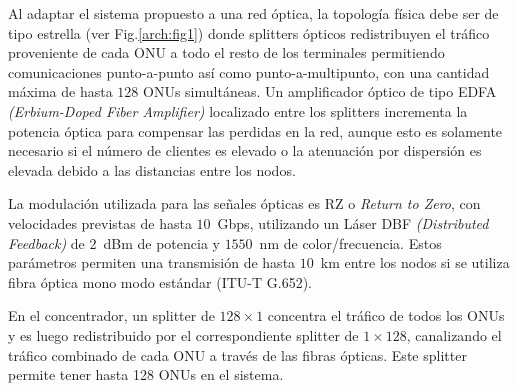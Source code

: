 


Al adaptar el sistema propuesto a una red óptica, la topología física debe ser de tipo estrella (ver Fig.\ref{arch:fig1}) donde splitters ópticos redistribuyen el tráfico proveniente de cada ONU a todo el resto de los terminales permitiendo comunicaciones punto-a-punto así como punto-a-multipunto, con una cantidad máxima de hasta $128$ ONUs simultáneas. 
Un amplificador óptico de tipo EDFA \textit{(Erbium-Doped Fiber Amplifier)} localizado entre los splitters incrementa la potencia óptica para compensar las perdidas en la red, aunque esto es solamente necesario si el número de clientes es elevado o la atenuación por dispersión es elevada debido a las distancias entre los nodos.

La modulación utilizada para las señales ópticas es RZ o \textit{Return to Zero}, con velocidades previstas de hasta $10$~Gbps, utilizando un Láser DBF \textit{(Distributed Feedback)} de $2$~dBm de potencia y $1550$~nm de color/frecuencia. Estos parámetros permiten una transmisión de hasta $10$~km entre los nodos si se utiliza fibra óptica mono modo estándar (ITU-T G.652).

En el concentrador, un splitter de $128\times 1$ concentra el tráfico de todos los ONUs y es luego redistribuido por el correspondiente splitter de $1\times 128$, canalizando el tráfico combinado de cada ONU a través de las fibras ópticas. Este splitter permite tener hasta 128 ONUs en el sistema.

